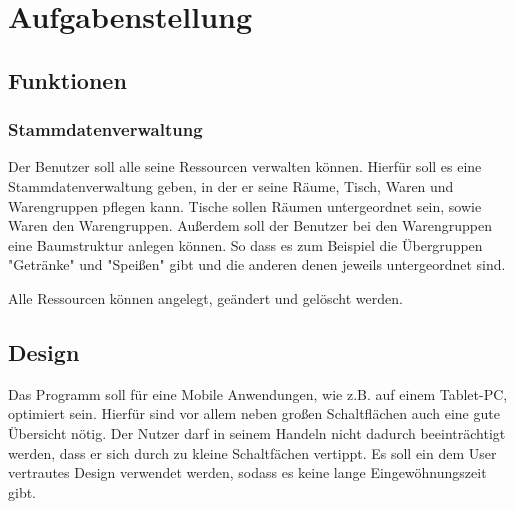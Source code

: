 \section{Aufgabenstellung}

\subsection{Funktionen}

\subsubsection{Stammdatenverwaltung}

Der Benutzer soll alle seine Ressourcen verwalten können. Hierfür soll es eine Stammdatenverwaltung geben, in der er seine Räume, Tisch, Waren und Warengruppen pflegen kann. Tische sollen Räumen untergeordnet sein, sowie Waren den Warengruppen. Außerdem soll der Benutzer bei den Warengruppen eine Baumstruktur anlegen können. So dass es zum Beispiel die Übergruppen "Getränke" und "Speißen" gibt und die anderen denen jeweils untergeordnet sind. 

Alle Ressourcen können angelegt, geändert und gelöscht werden. 

\subsection{Design}

Das Programm soll für eine Mobile Anwendungen, wie z.B. auf einem Tablet-PC, optimiert sein. Hierfür sind vor allem neben großen Schaltflächen auch eine gute Übersicht nötig. Der Nutzer darf in seinem Handeln nicht dadurch beeinträchtigt werden, dass er sich durch zu kleine Schaltfächen vertippt. Es soll ein dem User vertrautes Design verwendet werden, sodass es keine lange Eingewöhnungszeit gibt. 